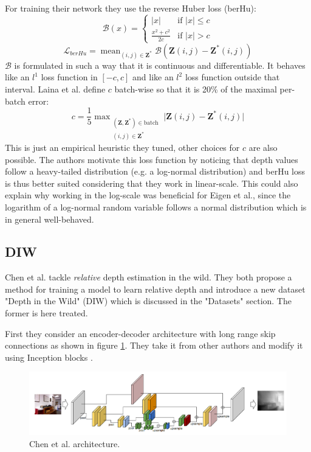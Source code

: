 For training their network they use the reverse Huber loss (berHu):
\begin{equation}
	\mathcal{B}(x) = 
	\begin{cases}
		|x| & \text{if } |x| \leq c \\
		\frac{x^{2} + c^{2}}{2c} & \text{if } |x| > c
	\end{cases}
\end{equation}
\[
	\mathcal{L}_{berHu} = \mathop{\text{mean}}_{(i, j) \in \mathbf{Z}^{*}} \mathcal{B}(\mathbf{Z}(i, j) - \mathbf{Z}^{*}(i, j))
\]
$\mathcal{B}$ is formulated in such a way that it is continuous and differentiable.
It behaves like an $l^{1}$ loss function in $[-c, c]$ and like an $l^{2}$ loss function outside that interval.
Laina et al. define $c$ batch-wise so that it is 20\% of the maximal per-batch error:
\[
	c = \frac{1}{5} \mathop{\text{max}}_{
		\substack{
			(\mathbf{Z}, \mathbf{Z}^{*}) \in \text{batch} \\
			(i, j) \in \mathbf{Z}^{*}
		}
	} \big| \mathbf{Z}(i, j) - \mathbf{Z}^{*}(i, j) \big|
\]
This is just an empirical heuristic they tuned, other choices for $c$ are also possible.
The authors motivate this loss function by noticing that depth values follow a heavy-tailed distribution (e.g. a log-normal distribution) and berHu loss is thus better suited considering that they work in linear-scale.
This could also explain \cite{Laina} why working in the log-scale was beneficial for Eigen et al., since the logarithm of a log-normal random variable follows a normal distribution which is in general well-behaved.

\subsection{DIW}
Chen et al. \cite{DIW} tackle \textit{relative} depth estimation in the wild.
They both propose a method for training a model to learn relative depth and introduce a new dataset "Depth in the Wild" (DIW) which is discussed in the "Datasets" section.
The former is here treated.

First they consider an encoder-decoder architecture with long range skip connections as shown in figure \ref{fig:DIW_architecture}.
They take it from other authors and modify it using Inception blocks \cite{Inception}.

\begin{figure}
\centering
\includegraphics[scale=0.4]{figs/DIW_architecture}
\caption{Chen et al. \cite{DIW} architecture. \label{fig:DIW_architecture}}
\end{figure}

